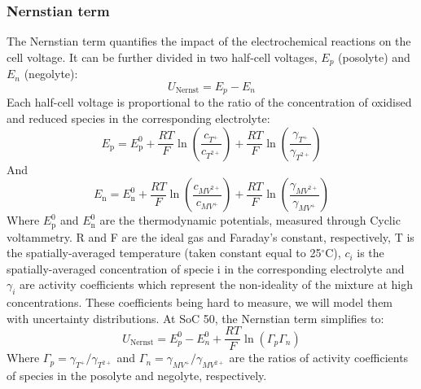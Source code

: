 \documentclass[a4paper,12pt]{article} %
\begin{document}
\subsubsection{Nernstian term}
The Nernstian term quantifies the impact of the electrochemical reactions on the cell voltage. It can be further divided in two half-cell voltages, $E_p$ (posolyte) and $E_n$ (negolyte):
\begin{equation}
    U_{\text{Nernst}} = E_p - E_n
\end{equation}
Each half-cell voltage is proportional to the ratio of the concentration of oxidised and reduced species in the corresponding electrolyte:
\begin{equation}
    E_{\text{p}} = E_{\text{p}}^0 + \frac{RT}{F} \ln \left( \frac{c_{T^+}}{c_{T^{2+}}} \right) + \frac{RT}{F} \ln \left( \frac{\gamma_{T^+}}{\gamma_{T^{2+}}} \right)
\end{equation}
And
\begin{equation}
    E_{\text{n}} = E_{\text{n}}^0 + \frac{RT}{F} \ln \left( \frac{c_{MV^{2+}}}{c_{MV^{+}}} \right) + \frac{RT}{F} \ln \left( \frac{\gamma_{MV^{2+}}}{\gamma_{MV^{+}}} \right)
\end{equation}
Where $E_{\text{p}}^0$ and $E_{\text{n}}^0$ are the thermodynamic potentials, measured through Cyclic voltammetry. R and F are the ideal gas and Faraday's constant, respectively, T is the spatially-averaged temperature (taken constant equal to 25$^{\circ}$C), $c_i$ is the spatially-averaged concentration of specie i in the corresponding electrolyte and $\gamma_i$ are activity coefficients which represent the non-ideality of the mixture at high concentrations. These coefficients being hard to measure, we will model them with uncertainty distributions.
At SoC 50, the Nernstian term simplifies to:
\begin{equation}
    \boxed{U_{\text{Nernst}} = E_p^0 - E_n^0 +  \frac{RT}{F} \ln \left( \Gamma_{p} \Gamma_{n}  \right)}
    \label{Nernst}
\end{equation}
Where $\Gamma_p = \gamma_{T^+}/\gamma_{T^{2+}}$ and $\Gamma_n = \gamma_{MV^+}/\gamma_{MV^{2+}}$ are the ratios of activity coefficients of species in the posolyte and negolyte, respectively.
\end{document}
